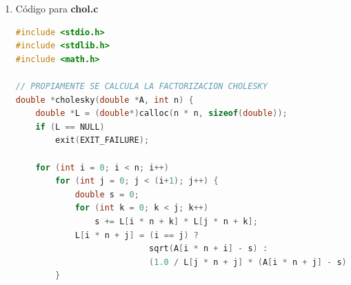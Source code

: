 \documentclass[10pt, oneside,spanish]{article}
\begin{document}
\begin{enumerate}
\begin{lstlisting}[language=C]
arreglo_2d_T cholesky(double *A,int n){

int k,j,i,l;
double s=0;
int thr =1;
arreglo_2d_T L;
L=malloc(sizeof(*L));
columnas(L) =n;
renglones(L)=n;
entradas(L)=calloc(renglones(L)*columnas(L),sizeof(double));


for(j=0;j<n;j++){
        s=0;
        for(k=0;k<j;k++){

		s+= entrada(L,j,k)*entrada(L,j,k);
        	/*printf("(L[%d,%d])L[%d,%d]:%f\n s: %f\n",j,j,j,k,entrada(L,j,k),s);*/
	}
	
	entrada(L,j,j) = sqrt(A[j * n + j]-s);
	/*printf("(A[%d,%d]):%f==========L[%d,%d]:%f=========\n",j,j,A[j * n + j],j,j,entrada(L,j,j));*/
        thr = n-(j+1);
        #pragma omp parallel for num_threads(thr) private(s,i,l)
        for (i=j+1;i<n;i++){
                double s =0;
                
/*printf("Thread: %d de %d para calcular L(%d,%d)\n",omp_get_thread_num()+1,omp_get_num_threads(),i,j);*/
		
                for (l=0;l<j;l++){

			s+=entrada(L,i,l) * entrada(L,j,l);
			
			/*printf("(L[%d,%d]:)(il)L[%d,%d]:%f\n s: %f\n",i,j,i,l,entrada(L,i,l),s);
			printf("(L[%d,%d]:)(jl)L[%d,%d]:%f\n s: %f\n",i,j,j,l,entrada(L,j,l),s);*/
                }
		entrada(L,i,j) = (1.0 / entrada(L,j,j) ) * (A[i * n + j]-s);
		/*printf("==========L[%d,%d]:%f=========L[%d,%d]:%f============================\n",j,j,entrada(L,j,j),i,j,entrada(L,i,j));*/
        }
}

return L;
}
\end{lstlisting}

\item Código para \textbf{chol.c}
\begin{lstlisting}[language=C]
#include <stdio.h>
#include <stdlib.h>
#include <math.h>
 
// PROPIAMENTE SE CALCULA LA FACTORIZACION CHOLESKY
double *cholesky(double *A, int n) {
    double *L = (double*)calloc(n * n, sizeof(double));
    if (L == NULL)
        exit(EXIT_FAILURE);
 
    for (int i = 0; i < n; i++)
        for (int j = 0; j < (i+1); j++) {
            double s = 0;
            for (int k = 0; k < j; k++)
                s += L[i * n + k] * L[j * n + k];
            L[i * n + j] = (i == j) ?
                           sqrt(A[i * n + i] - s) :
                           (1.0 / L[j * n + j] * (A[i * n + j] - s));
        }
 

\end{lstlisting}
\end{enumerate}
\end{document}
